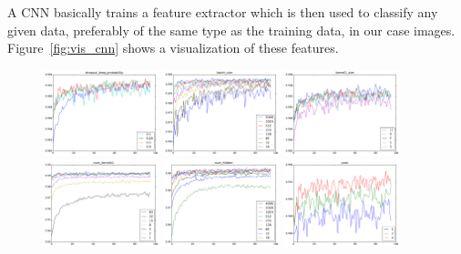 \documentclass{article}
\begin{document}
\begin{enumerate}
\begin{item}
	\end{item}
	\begin{item}
		A CNN basically trains a feature extractor which is then used to classify any given data, preferably of the same type as the training data, in our case images. Figure~\ref{fig:vis_cnn} shows a visualization of these features.
	\end{item}
	\begin{item}
		\begin{figure}
			\centering
			\includegraphics[width=0.3\textwidth]{figures/dropout_keep_probability}
			\includegraphics[width=0.3\textwidth]{figures/batch_size}
			\includegraphics[width=0.3\textwidth]{figures/kernel1_size}
			\includegraphics[width=0.3\textwidth]{figures/num_kernels1}
			\includegraphics[width=0.3\textwidth]{figures/num_hidden}
			\includegraphics[width=0.3\textwidth]{figures/pool}

\end{figure}
\end{item}
\end{enumerate}
\end{document}
